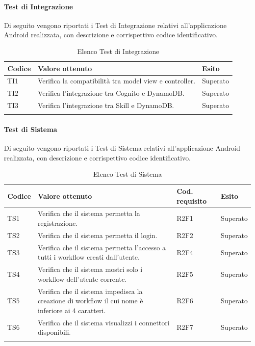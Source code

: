 \paragraph{Test di Integrazione}
\label{sec:tiRP}
Di seguito vengono riportati i Test di Integrazione relativi all'applicazione Android realizzata, con descrizione e corrispettivo codice identificativo.
\begin{center}
	\centering
	\renewcommand{\arraystretch}{1.5}
	\begin{longtable}{  p{1.5cm}  p{10.5cm} p{2cm}  }
		\rowcolor{tableHeadYellow}
		\textbf{Codice}   & \textbf{Valore ottenuto} & \textbf{Esito} \\ 
		\endhead
		TI1 & Verifica la compatibilità tra model view e controller.  & Superato \\
		TI2 & Verifica l’integrazione tra Cognito e DynamoDB. & Superato \\
		TI3 & Verifica l’integrazione tra Skill e DynamoDB. & Superato \\
		\rowcolor{white}
		\caption{Elenco Test di Integrazione}
	\end{longtable}
\end{center}
\paragraph{Test di Sistema}
\label{sec:tsRP}
Di seguito vengono riportati i Test di Sistema relativi all'applicazione Android realizzata, con descrizione e corrispettivo codice identificativo.
\begin{center}
	\centering
	\renewcommand{\arraystretch}{1.5}
	\begin{longtable}{  p{1.2cm}  p{8.5cm} p{2cm} p{1.5cm} }
		\rowcolor{tableHeadYellow}
		\textbf{Codice}   & \textbf{Valore ottenuto} & \textbf{Cod. \mbox{requisito}} & \textbf{Esito} \\ 
		\endhead
		TS1 & Verifica che il sistema permetta la registrazione. & R2F1 & Superato \\
		TS2 & Verifica che il sistema permetta il login. & R2F2 & Superato \\
		TS3 & Verifica che il sistema permetta l’accesso a tutti i workflow creati dall’utente. & R2F4 & Superato \\
		TS4 & Verifica che il sistema mostri solo i workflow dell’utente corrente. & R2F5 & Superato \\
		TS5 & Verifica che il sistema impedisca la creazione di workflow il cui nome è inferiore ai 4 caratteri. & R2F6 & Superato \\
		TS6 & Verifica che il sistema visualizzi i connettori disponibili. & R2F7 & Superato \\
		\rowcolor{white}
		\caption{Elenco Test di Sistema}
	\end{longtable}
\end{center}
